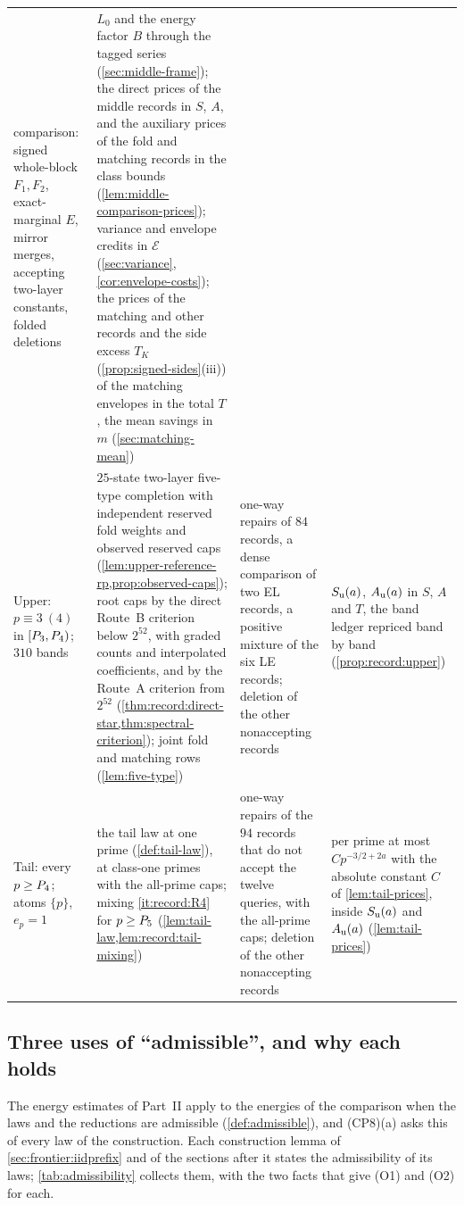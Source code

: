 {\begin{longtable}{@{}>{\raggedright\arraybackslash}p{2.55cm}%
>{\raggedright\arraybackslash}p{4.55cm}%
>{\raggedright\arraybackslash}p{3.3cm}%
>{\raggedright\arraybackslash}p{4.25cm}@{}}
 comparison: signed whole-block $F_1,F_2$, exact-marginal $E$, mirror
 merges, accepting two-layer constants, folded deletions
& $L_0$ and the energy factor $B$ through the tagged series
(\cref{sec:middle-frame}); the direct
 prices of the middle records in $S$, $A$, and the auxiliary prices of the
 fold and matching records in the class bounds
 (\cref{lem:middle-comparison-prices}); variance and envelope credits in
 $\mathcal E$ (\cref{sec:variance}, \cref{cor:envelope-costs}); the prices of
 the matching and other records and the side excess $T_K$
(\cref{prop:signed-sides}(iii)) of the matching
 envelopes in the total $T$, the mean savings in $m$ (\cref{sec:matching-mean})\\
\addlinespace
Upper: $p\equiv3\ (4)$ in $[P_3,P_4)$; $310$ bands
& $25$-state two-layer five-type completion with independent reserved fold
 weights and observed reserved caps
 (\cref{lem:upper-reference-rp,prop:observed-caps}); root caps by the direct
 Route~B criterion below $2^{52}$, with graded counts and interpolated
 coefficients, and by the Route~A criterion from $2^{52}$
 (\cref{thm:record:direct-star,thm:spectral-criterion}); joint fold and
 matching rows (\cref{lem:five-type})
& one-way repairs of $84$ records, a dense comparison of two EL records, a
 positive mixture of the six LE records; deletion of the other nonaccepting
 records
& $S_{\rm u}(a)$, $A_{\rm u}(a)$ in $S$, $A$ and $T$, the band ledger repriced
 band by band (\cref{prop:record:upper})\\
\addlinespace
Tail: every $p\ge P_4$; atoms $\{p\}$, $e_p=1$
& the tail law at one prime (\cref{def:tail-law}), at class-one primes with
 the all-prime caps; mixing \ref{it:record:R4} for $p\ge P_5$
 (\cref{lem:tail-law,lem:record:tail-mixing})
& one-way repairs of the $94$ records that do not accept the twelve queries,
 with the all-prime caps; deletion of the other nonaccepting records
& per prime at most $Cp^{-3/2+2a}$ with the absolute constant $C$
  of \cref{lem:tail-prices}, inside $S_{\rm u}(a)$ and
  $A_{\rm u}(a)$
 (\cref{lem:tail-prices})\\
\end{longtable}
}

\subsection{Three uses of ``admissible'', and why each holds}\label{subsec:design-admissibility}

The energy estimates of Part~II apply to the energies of the comparison when
the laws and the reductions are admissible (\cref{def:admissible}), and (CP8)(a)
asks this of every law of the construction. Each construction lemma of
\cref{sec:frontier:iidprefix} and of the sections after it states the
admissibility of its laws; \cref{tab:admissibility} collects them, with the two
facts that give (O1) and (O2) for each.

